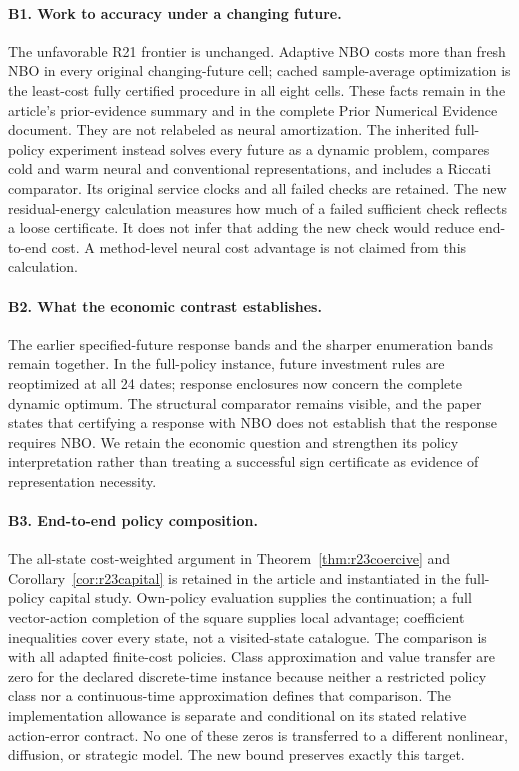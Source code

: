 \paragraph{B1. Work to accuracy under a changing future.}
The unfavorable R21 frontier is unchanged. Adaptive NBO costs more than fresh
NBO in every original changing-future cell; cached sample-average optimization
is the least-cost fully certified procedure in all eight cells. These facts
remain in the article's prior-evidence summary and in the complete Prior
Numerical Evidence document. They are not relabeled as neural amortization.
The inherited full-policy experiment instead solves every future as a dynamic
problem, compares cold and warm neural and conventional representations, and
includes a Riccati comparator. Its original service clocks and all failed
checks are retained. The new residual-energy calculation measures how much
of a failed sufficient check reflects a loose certificate. It does not infer
that adding the new check would reduce end-to-end cost. A method-level neural
cost advantage is not claimed from this calculation.

\paragraph{B2. What the economic contrast establishes.}
The earlier specified-future response bands and the sharper enumeration
bands remain together. In the full-policy instance, future investment rules
are reoptimized at all 24 dates; response enclosures now concern the complete
dynamic optimum. The structural comparator remains visible, and the paper
states that certifying a response with NBO does not establish that the
response requires NBO. We retain the economic question and strengthen its
policy interpretation rather than treating a successful sign certificate
as evidence of representation necessity.

\paragraph{B3. End-to-end policy composition.}
The all-state cost-weighted argument in
Theorem~\ref{thm:r23coercive} and Corollary~\ref{cor:r23capital} is retained
in the article and instantiated in the full-policy capital study. Own-policy
evaluation supplies the continuation; a full vector-action completion of the
square supplies local advantage; coefficient inequalities cover every state,
not a visited-state catalogue. The comparison is with all adapted finite-cost
policies. Class approximation and value transfer are zero for the declared
discrete-time instance because neither a restricted policy class nor a
continuous-time approximation defines that comparison. The implementation
allowance is separate and conditional on its stated relative action-error
contract. No one of these zeros is transferred to a different nonlinear,
diffusion, or strategic model. The new bound preserves exactly this target.

